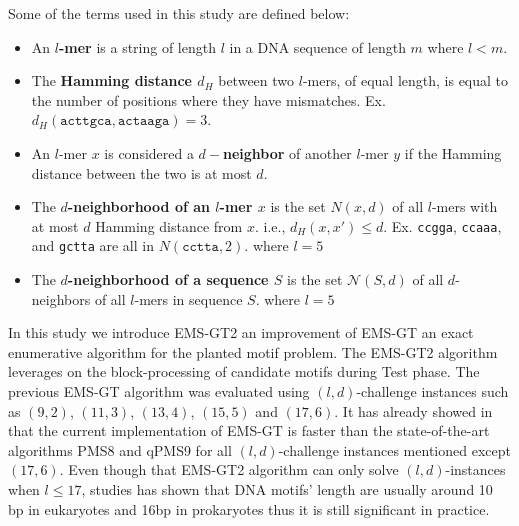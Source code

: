	Some of the terms used in this study are defined below:
	\begin{itemize}
		\item An \textbf{\boldmath $l$-mer} is a string of length $l$ in a DNA sequence of length $m$ where $l < m$.

		\item The \textbf{\boldmath Hamming distance $d_H$} between two $l$-mers, of equal length, is equal to the number of positions where they have mismatches. Ex. $d_H(\texttt{acttgca}, \texttt{actaaga}) = 3$. 

		\item An $l$-mer $x$ is considered a \textbf{\boldmath $d-$neighbor} of another $l$-mer $y$ if the Hamming distance between the two is at most $d$.

		\item The \textbf{\boldmath $d$-neighborhood of an $l$-mer $x$} is the set {\boldmath $N(x, d)$} of all $l$-mers with at most $d$ Hamming distance from $x$. i.e., {\boldmath $d_H (x, x') \leq d$}.
		\newline 
		Ex. \texttt{ccgga}, \texttt{ccaaa}, and \texttt{gctta} are all in $N(\texttt{cctta}, 2)$. \newline
		where $l = 5$

		\item The \textbf{\boldmath $d$-neighborhood of a sequence $S$}
		is the set {\boldmath $\mathcal{N}(S, d)$} of all $d$-neighbors of all $l$-mers in sequence $S$.
		 \newline
					where $l = 5$ \newline
	\end{itemize} 

	In this study we introduce EMS-GT2 an improvement of EMS-GT an exact enumerative algorithm for the planted motif problem. The EMS-GT2 algorithm leverages on the block-processing of candidate motifs during Test phase. The previous EMS-GT algorithm was evaluated using $(l, d)$-challenge instances such as $(9, 2)$, $(11, 3)$, $(13, 4)$, $(15, 5)$ and $(17, 6)$. It has already showed in \cite{EMSGTJournal} that the current implementation of EMS-GT is faster than the state-of-the-art algorithms PMS8 and qPMS9 for all $(l, d)$-challenge instances mentioned except $(17, 6)$. Even though that EMS-GT2 algorithm can only solve $(l, d)$-instances when $l \leq 17$, studies has shown that DNA motifs' length are usually around 10 bp in eukaryotes and 16bp in prokaryotes \cite{stewart2012transcription} thus it is still significant in practice.
